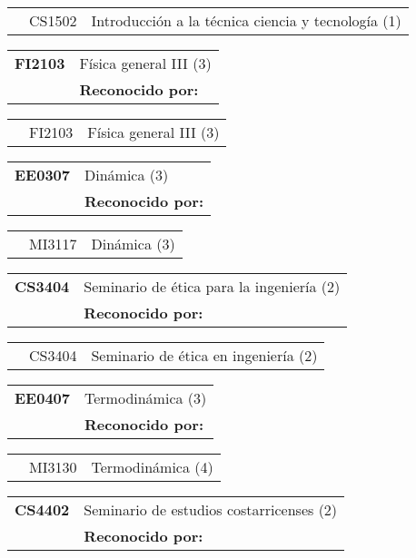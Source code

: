 \documentclass[letterpaper]{article}%
\begin{document}
\begin{tabularx}{\textwidth}{p{1.5cm}p{1.5cm}p{10cm}}%
&CS1502&Introducción a la técnica ciencia y tecnología (1)\\%
\end{tabularx}%
\begin{tabularx}{\textwidth}{p{1.5cm}p{10cm}}%
\textbf{FI2103}&Física general III (3)\\%
&\textbf{Reconocido por: }\\%
\end{tabularx}%
\begin{tabularx}{\textwidth}{p{1.5cm}p{1.5cm}p{10cm}}%
&FI2103&Física general III (3)\\%
\end{tabularx}%
\begin{tabularx}{\textwidth}{p{1.5cm}p{10cm}}%
\textbf{EE0307}&Dinámica (3)\\%
&\textbf{Reconocido por: }\\%
\end{tabularx}%
\begin{tabularx}{\textwidth}{p{1.5cm}p{1.5cm}p{10cm}}%
&MI3117&Dinámica (3)\\%
\end{tabularx}%
\begin{tabularx}{\textwidth}{p{1.5cm}p{10cm}}%
\textbf{CS3404}&Seminario de ética para la ingeniería (2)\\%
&\textbf{Reconocido por: }\\%
\end{tabularx}%
\begin{tabularx}{\textwidth}{p{1.5cm}p{1.5cm}p{10cm}}%
&CS3404&Seminario de ética en ingeniería (2)\\%
\end{tabularx}%
\begin{tabularx}{\textwidth}{p{1.5cm}p{10cm}}%
\textbf{EE0407}&Termodinámica (3)\\%
&\textbf{Reconocido por: }\\%
\end{tabularx}%
\begin{tabularx}{\textwidth}{p{1.5cm}p{1.5cm}p{10cm}}%
&MI3130&Termodinámica (4)\\%
\end{tabularx}%
\begin{tabularx}{\textwidth}{p{1.5cm}p{10cm}}%
\textbf{CS4402}&Seminario de estudios costarricenses (2)\\%
&\textbf{Reconocido por: }\\%
\end{tabularx}%
\end{document}
